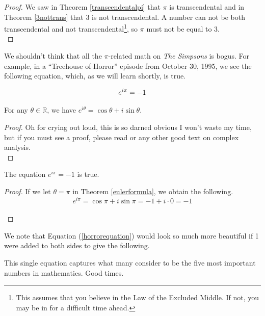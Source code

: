 \begin{proof}
We saw in Theorem \ref{transcendentalpi} that $\pi$ is transcendental
and in Theorem \ref{3nottrans} that 3 is not transcendental. A number
can not be both transcendental and not transcendental\footnote{This
assumes that you believe in the Law of the Excluded Middle. If not, 
you may be in for a difficult time ahead.}, so $\pi$ must not be equal
 to 3.\\
\end{proof}

We shouldn't think that all the $\pi$-related math on \emph{The Simpsons} 
is bogus. For example, in a ``Treehouse of Horror'' episode from October 30,
1995, we see the following equation, which, as we will learn shortly,
is true.

\begin{equation}\label{horrorequation}
e^{i\pi}=-1\\
\end{equation}

\begin{thm}\label{eulerformula}
For any $\theta\in\mathbb{R}$, we have $e^{i\theta}=\cos\theta+i\sin\theta$.
\end{thm}

\begin{proof}
Oh for crying out loud, this is so darned obvious I won't waste my time, but
if you must see a proof, please read \cite{LA1979} or any other good text on
complex analysis.\\
\end{proof}

\begin{cor}
The equation $e^{i\pi}=-1$ is true.
\end{cor}

\begin{proof}
If we let $\theta=\pi$ in Theorem \ref{eulerformula}, we obtain the following.
$$e^{i\pi}=\cos\pi+i\sin\pi=-1+i\cdot 0 = -1$$\\
\end{proof}

\begin{rem}
We note that Equation (\ref{horrorequation}) would look so much more beautiful
if 1 were added to both sides to give the following.
\begin{center}
\end{center}
This single equation captures what many consider to be the five most important
numbers in mathematics. Good times.
\end{rem}
